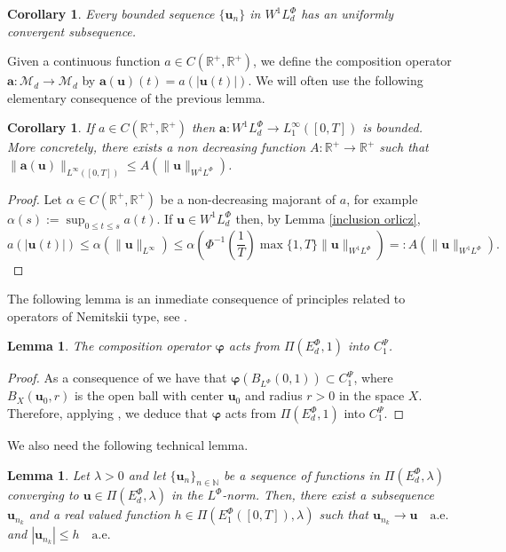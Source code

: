 \documentclass[twoside]{article}
\newtheorem{cor}[thm]{Corollary}
\newtheorem{lem}[thm]{Lemma}
\theoremstyle{remark}
\newcommand{\lphi}{L^{\Phi}}
\newcommand{\ephi}{E^{\Phi}}
\newcommand{\wphi}{W^{1}\lphi}
\renewcommand{\b}[1]{\boldsymbol{#1}}
\renewcommand{\leq}{\leqslant}
\begin{document}
 \begin{cor}\label{unif_conv} Every bounded sequence $\{\b{u}_n\}$ in  $\wphi_d$  has an uniformly convergent subsequence. 
\end{cor}



 Given a continuous function $a\in C(\mathbb{R}^+,\mathbb{R}^+)$, we define the composition operator $\b{a}:\mathcal{M}_d\to \mathcal{M}_d$ by $\b{a}(\b{u})(t)= a(|\b{u}(t)|)$.
We will often use the following elementary consequence of the previous lemma. 
\begin{cor}\label{a_bound} If $a\in C(\mathbb{R}^+,\mathbb{R}^+)$ then $\b{a}:\wphi_d\to L^{\infty}_1([0,T])$ is bounded. 
More concretely,  there exists a non decreasing function $A:\mathbb{R}^+\to\mathbb{R}^+$ such that
 $\|\b{a}(\b{u})\|_{L^{\infty}([0,T])}\leq A(\|\b{u}\|_{\wphi})$.
\end{cor}

\begin{proof}  Let $\alpha\in C(\mathbb{R}^+,\mathbb{R}^+)$ be a  non-decreasing majorant of $a$, for example 
$\alpha(s):=\sup_{0\leq t\leq s}a(t)$.  If $\b{u}\in \wphi_d$ then, by Lemma \ref{inclusion orlicz}, 
\[a(|\b{u}(t)|)\leq \alpha(\|\b{u}\|_{L^{\infty}})\leq 
\alpha\left(\Phi^{-1}\left(\frac{1}{T}\right)\max\{1,T\} \|\b{u}\|_{\wphi}\right)=: 
A(\|\b{u}\|_{\wphi}).\]
\end{proof}


The following lemma is an inmediate consequence of principles  related to  operators of Nemitskii type, see \cite[�17]{KR}.

\begin{lem}\label{phi_comp}   
The  composition operator  $\boldsymbol{\varphi}$  acts from $\Pi(\ephi_d,1)$ into $C_1^{\Psi}$.
\end{lem}
\begin{proof}
  As a consequence of \cite[Lemma 9.1]{KR} we have that  $\boldsymbol{\varphi}\left(B_{\lphi}(0,1)\right)\subset C_1^{\Psi}$, where
$B_{X}(\b{u}_0,r)$ is the open ball with center $\b{u}_0$ and radius $r>0$ in the space $X$. Therefore, applying \cite[Lemma 17.1]{KR}, we deduce that $\boldsymbol{\varphi}$ acts from $\Pi(\ephi_d,1)$ into $C_1^{\Psi}$.
\end{proof}

We also need the following technical lemma.
\begin{lem}\label{segundo lema}
Let $\lambda>0$ and let $\{\b{u}_n\}_{n\in \mathbb{N}}$ be a sequence of  functions in $\Pi(\ephi_d,\lambda)$ converging to  $\b{u}\in \Pi(\ephi_d,\lambda)$  in the $\lphi$-norm. Then, there exist a subsequence
$\b{u}_{n_k}$ and a real valued function $h\in\Pi\left(\ephi_1\left([0,T]\right),\lambda\right)$ such that $\b{u}_{n_k}\rightarrow \b{u} \quad\text{a.e.}$ and $|\b{u}_{n_k}|\leq h\quad\text{a.e.}$
\end{lem}
\end{document}
